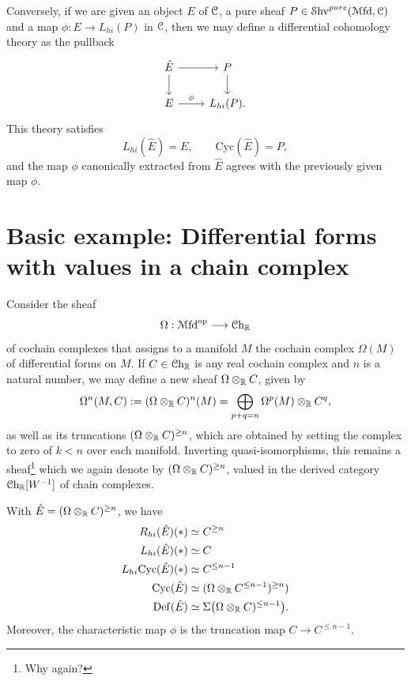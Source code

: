 \documentclass[10pt]{amsart}
\begin{document}
Conversely, if we are given an object $E$ of $\mathcal{C}$, a pure sheaf $P \in \mathcal{S}\mathrm{hv}^{pure}(\mathcal{M}\mathrm{fd}, \mathcal{C})$ and a map $\phi: E \to L_{hi}(P)$ in $\mathcal{C}$, then we may define a differential cohomology theory as the pullback
\[
\begin{tikzcd}
	\hat{E} \ar[r] \ar[d] & P
	\ar[d]
	\\
	E \ar[r, "\phi"] & L_{hi}(P).
\end{tikzcd}
\]
This theory satisfies
\[
L_{hi}(\hat{E}) = E, \qquad \mathrm{Cyc}(\hat{E}) = P, 
\]
and the map $\phi$ canonically extracted from $\hat{E}$ agrees with the previously given map $\phi$.


\section{Basic example: Differential forms with values in a chain complex}
Consider the sheaf
\[
\Omega : \mathcal{M}\mathrm{fd}^{\mathrm{op}} \longrightarrow \mathcal{C}\mathrm{h}_{\mathbb{R}}
\]
of cochain complexes that assigns to a manifold $M$ the cochain complex $\Omega(M)$ of differential forms on $M$. If $C \in \mathcal{C}\mathrm{h}_{\mathbb{R}}$ is any real cochain complex and $n$ is a natural number, we may define a new sheaf $\Omega \otimes_{\mathbb{R}} C$, given by
\[
\Omega^n(M, C) := (\Omega \otimes_{\mathbb{R}} C)^n(M) = \bigoplus_{p + q = n} \Omega^p(M) \otimes_{\mathbb{R}} C^q,
\]
as well as its truncations $(\Omega \otimes_{\mathbb{R}} C)^{\geq n}$, which are obtained by setting the complex to zero of $k < n$ over each manifold. Inverting quasi-isomorphisms, this remains a sheaf\footnote{Why again?} which we again denote by $(\Omega \otimes_{\mathbb{R}} C)^{\geq n}$, valued in the derived category $\mathcal{C}\mathrm{h}_{\mathbb{R}}[W^{-1}]$ of chain complexes.
 
\begin{theorem}\cite[Lemma~4.4]{bunkenikolausvoelkl2016diffcoh}
With $\hat{E} = (\Omega \otimes_{\mathbb{R}} C)^{\geq n}$, we have
 \begin{align*}
R_{hi}(\hat{E})(*) &\simeq C^{\geq n}
\\
L_{hi}(\hat{E})(*) &\simeq C
\\
L_{hi}\mathrm{Cyc}(\hat{E})(*) &\simeq C^{\leq n-1}
\\
\mathrm{Cyc}(\hat{E}) &\simeq (\Omega \otimes_{\mathbb{R}} C^{\leq n-1})^{\geq n})
\\
\mathrm{Def}(\hat{E}) &\simeq \Sigma \bigl(\Omega \otimes_{\mathbb{R}} C)^{\leq n-1}\bigr).
 \end{align*}	
Moreover, the characteristic map $\phi$ is the truncation map $C \to C^{\leq n-1}$.
 \end{theorem}
 
\end{document}
